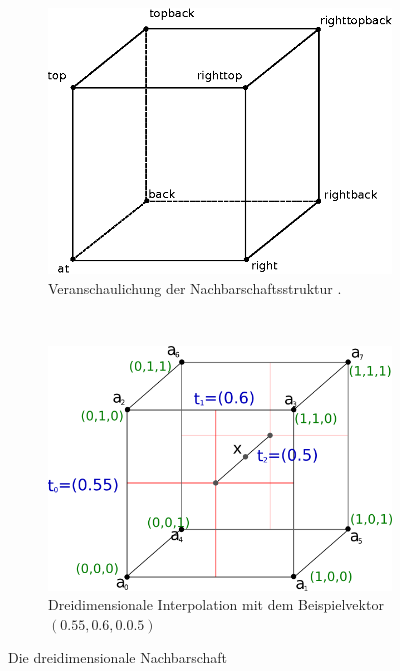 \begin{figure}
	\begin{subfigure}[t]{0.5\textwidth}
		\centering
		\includegraphics[width=\textwidth]{images/right_neighborhood}
                \caption{Veranschaulichung der Nachbarschaftsstruktur .}
                \label{fig:implementation_right_neighbors}
	\end{subfigure}
	~
	\begin{subfigure}[t]{0.5\textwidth}
		\centering
		\includegraphics[width=\textwidth]{images/ndinterpolation}
		\caption{Dreidimensionale Interpolation mit dem Beispielvektor $(0.55,0.6,0.0.5)$}
		\label{fig:implementation_wind_interpolation}
	\end{subfigure}
	\caption{Die dreidimensionale Nachbarschaft }
\end{figure}

